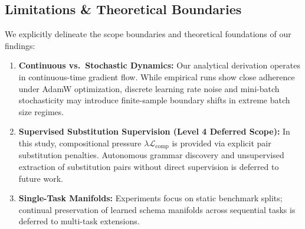 \documentclass{article}
\theoremstyle{plain}
\theoremstyle{definition}
\begin{document}
\subsection{Limitations \& Theoretical Boundaries}
We explicitly delineate the scope boundaries and theoretical foundations of our findings:
\begin{enumerate}[leftmargin=*,noitemsep]
    \item \textbf{Continuous vs.\ Stochastic Dynamics:} Our analytical derivation operates in continuous-time gradient flow. While empirical runs show close adherence under AdamW optimization, discrete learning rate noise and mini-batch stochasticity may introduce finite-sample boundary shifts in extreme batch size regimes.
    \item \textbf{Supervised Substitution Supervision (Level 4 Deferred Scope):} In this study, compositional pressure $\lambda \mathcal{L}_{\text{comp}}$ is provided via explicit pair substitution penalties. Autonomous grammar discovery and unsupervised extraction of substitution pairs without direct supervision is deferred to future work.
    \item \textbf{Single-Task Manifolds:} Experiments focus on static benchmark splits; continual preservation of learned schema manifolds across sequential tasks is deferred to multi-task extensions.
\end{enumerate}
\end{document}
